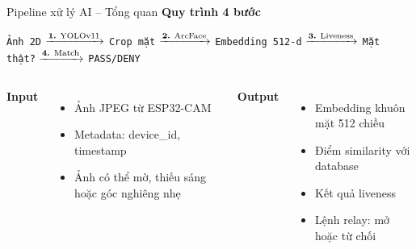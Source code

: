 \documentclass[aspectratio=169]{beamer}
\begin{document}
\begin{frame}{Pipeline xử lý AI -- Tổng quan}
  \textbf{Quy trình 4 bước}

  \vspace{0.4em}
  \begin{center}
    \footnotesize
    \texttt{Ảnh 2D}
    $\xrightarrow{\text{\textbf{1.} YOLOv11}}$ \texttt{Crop mặt}
    $\xrightarrow{\text{\textbf{2.} ArcFace}}$ \texttt{Embedding 512-d}
    $\xrightarrow{\text{\textbf{3.} Liveness}}$ \texttt{Mặt thật?}
    $\xrightarrow{\text{\textbf{4.} Match}}$ \texttt{PASS/DENY}
  \end{center}

  \vspace{0.8em}
  \begin{columns}[T]
      \textbf{Input}
      \begin{itemize}
        \item Ảnh JPEG từ ESP32-CAM
        \item Metadata: device\_id, timestamp
        \item Ảnh có thể mờ, thiếu sáng hoặc góc nghiêng nhẹ
      \end{itemize}

      \textbf{Output}
      \begin{itemize}
        \item Embedding khuôn mặt 512 chiều
        \item Điểm similarity với database
        \item Kết quả liveness
        \item Lệnh relay: mở hoặc từ chối
      \end{itemize}
  \end{columns}
\end{frame}
\end{document}
